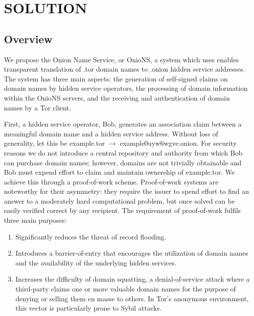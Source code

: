 
\chapter{SOLUTION}



\section{Overview}

We propose the Onion Name Service, or OnioNS, a system which uses enables transparent translation of .tor domain names to .onion hidden service addresses. The system has three main aspects: the generation of self-signed claims on domain names by hidden service operators, the processing of domain information within the OnioNS servers, and the receiving and authentication of domain names by a Tor client.

First, a hidden service operator, Bob, generates an association claim between a meaningful domain name and a hidden service address. Without loss of generality, let this be example.tor $ \rightarrow $ example0uyw6wgve.onion. For security reasons we do not introduce a central repository and authority from which Bob can purchase domain names; however, domains are not trivially obtainable and Bob must expend effort to claim and maintain ownership of example.tor. We achieve this through a proof-of-work scheme. Proof-of-work systems are noteworthy for their asymmetry: they require the issuer to spend effort to find an answer to a moderately hard computational problem, but once solved can be easily verified correct by any recipient. The requirement of proof-of-work fulfils three main purposes:

\begin{enumerate}
	\item Significantly reduces the threat of record flooding.
	\item Introduces a barrier-of-entry that encourages the utilization of domain names and the availability of the underlying hidden services.
	\item Increases the difficulty of domain squatting, a denial-of-service attack where a third-party claims one or more valuable domain names for the purpose of denying or selling them en masse to others. In Tor's anonymous environment, this vector is particularly prone to Sybil attacks.
\end{enumerate}

